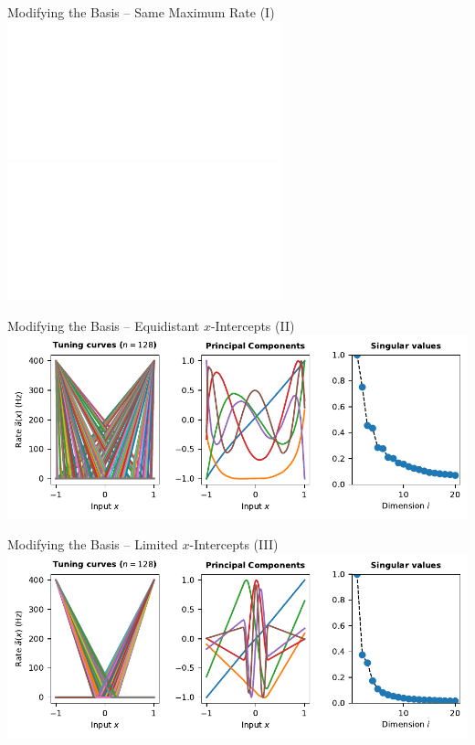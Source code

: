 \documentclass[handout,aspectratio=169]{beamer}
\begin{document}
	\begin{frame}{Modifying the Basis -- Same Maximum Rate (I)}
		\centering%
		\includegraphics<1>[width=\textwidth]{media/tuning_curve_relu_pca.pdf}%
		\includegraphics<2->[width=\textwidth]{media/tuning_curve_relu_pca_fix_max_rate.pdf}
		\begin{overlayarea}{\textwidth}{0.5cm}
			\centering
		\end{overlayarea}
	\end{frame}


	\begin{frame}{Modifying the Basis -- Equidistant $x$-Intercepts (II)}
		\centering%
		\includegraphics[width=\textwidth]{media/tuning_curve_relu_pca_fix_max_rate_intercepts_i.pdf}
		\begin{overlayarea}{\textwidth}{0.5cm}
			\centering
		\end{overlayarea}
	\end{frame}

	\begin{frame}{Modifying the Basis -- Limited $x$-Intercepts (III)}
		\centering%
		\includegraphics[width=\textwidth]{media/tuning_curve_relu_pca_fix_max_rate_intercepts_ii.pdf}
		\begin{overlayarea}{\textwidth}{0.5cm}
			\centering
		\end{overlayarea}
	\end{frame}
\end{document}
